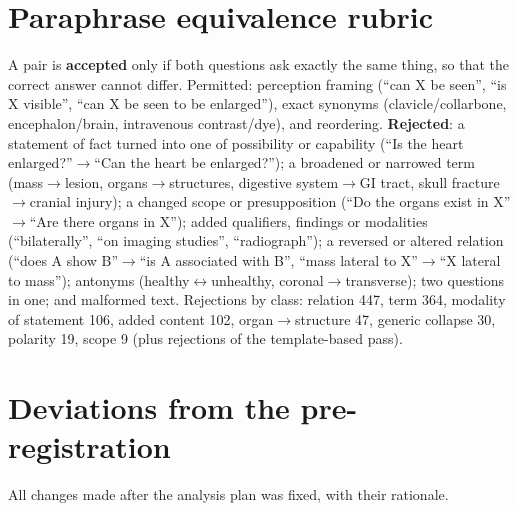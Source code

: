 \documentclass[10pt,twocolumn,letterpaper]{article}
\begin{document}
\section{Paraphrase equivalence rubric}
\label{app:rubric}
A pair is \textbf{accepted} only if both questions ask exactly the same thing, so that the correct answer cannot
differ. Permitted: perception framing (``can X be seen'', ``is X visible'', ``can X be seen to be enlarged''), exact
synonyms (clavicle/collarbone, encephalon/brain, intravenous contrast/dye), and reordering. \textbf{Rejected}: a
statement of fact turned into one of possibility or capability (``Is the heart enlarged?''$\to$``Can the heart be
enlarged?''); a broadened or narrowed term (mass$\to$lesion, organs$\to$structures, digestive system$\to$GI tract,
skull fracture$\to$cranial injury); a changed scope or presupposition (``Do the organs exist in X''$\to$``Are there
organs in X''); added qualifiers, findings or modalities (``bilaterally'', ``on imaging studies'',
``radiograph''); a reversed or altered relation (``does A show B''$\to$``is A associated with B'', ``mass lateral
to X''$\to$``X lateral to mass''); antonyms (healthy$\leftrightarrow$unhealthy, coronal$\to$transverse); two
questions in one; and malformed text. Rejections by class: relation 447, term 364, modality of statement 106,
added content 102, organ$\to$structure 47, generic collapse 30, polarity 19, scope 9 (plus rejections of the
template-based pass).

\section{Deviations from the pre-registration}
\label{app:dev}
All changes made after the analysis plan was fixed, with their rationale.
\end{document}
